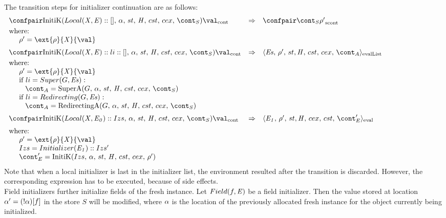 \documentclass{article}
\begin{document}
The transition steps for initializer continuation are as follows:
\[
  \begin{array}{lcl@{\hspace{30mm}}}
	\contconf{\InitK{Local(\variablemeta, \expr) :: []}{\loc}{\scont}}{\val}
	& \Rightarrow &
	\scontconf{\scont}{\env'}\\[1mm]
	\textrm{where:}\\
	\hspace{5mm}\env' = \ext{\env}{\variablemeta}{\val}\\[2mm]

	\contconf{\InitK{Local(\variablemeta, \expr) :: li :: []}{\loc}{\scont}}{\val}
	& \Rightarrow &
	\evallistconf{\exprs}{\env'}{\strace}{\cstrace}{\cex}{\acont}\\[1mm]
	\textrm{where:}\\
	\hspace{5mm}\env' = \ext{\env}{\variablemeta}{\val}\\
	\hspace{5mm}\textrm{if } li = Super(G, \exprs):\\
	\hspace{8mm}\acont = \SuperA{G}{\loc}{\scont}\\
	\hspace{5mm}\textrm{if } li = Redirecting(G, \exprs):\\
	\hspace{8mm}\acont = \RedirectingA{G}{\loc}{\scont}\\[2mm]

	\contconf{\InitK{Local(\variablemeta, \expri{0}) :: Izs}{\loc}{\scont}}{\val}
	& \Rightarrow &
	\evalconf{\expri{1}}{\env'}{st}{cex}{cst}{\econt'}\\[2mm]
	\textrm{where:}\\
	\hspace{5mm}\env' = \ext{\env}{\variablemeta}{\val}\\
	\hspace{5mm}Izs = Initializer(\expri{1}) :: Izs'\\
	\hspace{5mm}\econt' = \InitK{Izs}{\loc}{\env'}
  \end{array}
\]
\noindent
Note that when a local initializer is last in the initializer list, the environment resulted after the transition is discarded.
However, the corresponding expression has to be executed, because of side effects.
\\[2mm]
\noindent
Field initializers further initialize fields of the fresh instance.
Let $Field(f, \mathit{E})$ be a field initializer.
Then the value stored at location $\alpha' = (!\alpha)[f]$ in the store $S$ will be modified, where $\alpha$ is the location of the previously allocated fresh instance for the object currently being initialized.
\end{document}
